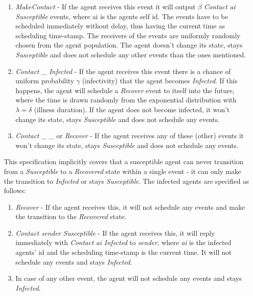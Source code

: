 \begin{enumerate}
	\item \textit{MakeContact} - If the agent receives this event it will output $\beta$  \textit{Contact ai Susceptible} events, where ai is the agents self id. The events have to be scheduled immediately without delay, thus having the current time as scheduling time-stamp. The receivers of the events are uniformly randomly chosen from the agent population. The agent doesn't change its state, stays \textit{Susceptible} and does not schedule any other events than the ones mentioned.
	
	\item \textit{Contact \_ Infected} - If the agent receives this event there is a chance of uniform probability $\gamma$ (infectivity) that the agent becomes \textit{Infected}. If this happens, the agent will schedule a \textit{Recover} event to itself into the future, where the time is drawn randomly from the exponential distribution with $\lambda = \delta$ (illness duration). If the agent does not become infected, it won't change its state, stays \textit{Susceptible} and does not schedule any events.
	
	\item \textit{Contact \_ \_} or \textit{Recover} - If the agent receives any of these (other) events it won't change its state, stays \textit{Susceptible} and does not schedule any events.
\end{enumerate}

This specification implicitly covers that a susceptible agent can never transition from a \textit{Susceptible} to a \textit{Recovered} state within a single event - it can only make the transition to \textit{Infected} or stays \textit{Susceptible}. The infected agents are specified as follows:

\begin{enumerate}
	\item \textit{Recover} - If the agent receives this, it will not schedule any events and make the transition to the \textit{Recovered} state.
	
	\item \textit{Contact sender Susceptible} - If the agent receives this, it will reply immediately with \textit{Contact ai Infected} to \textit{sender}, where \textit{ai} is the infected agents' id and the scheduling time-stamp is the current time. It will not schedule any events and stays \textit{Infected}.
	
	\item In case of any other event, the agent will not schedule any events and stays \textit{Infected}.
\end{enumerate}

